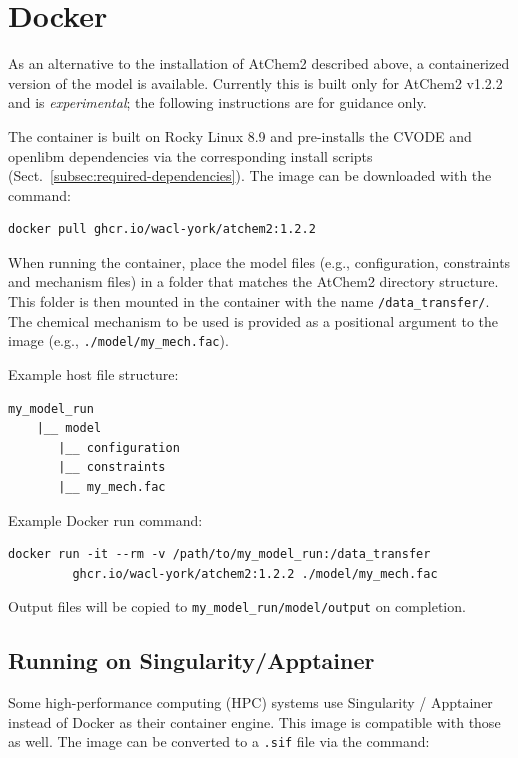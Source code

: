 \section{Docker} \label{sec:docker}

As an alternative to the installation of AtChem2 described above, a containerized version of
the model is available. Currently this is built only for AtChem2 v1.2.2 and is
\emph{experimental}; the following instructions are for guidance only.

The container is built on Rocky Linux 8.9 and pre-installs the CVODE and openlibm dependencies
via the corresponding install scripts (Sect.~\ref{subsec:required-dependencies}). The image can
be downloaded with the command:

\begin{Verbatim}[fontsize=\small]
  docker pull ghcr.io/wacl-york/atchem2:1.2.2
\end{Verbatim}

When running the container, place the model files (e.g., configuration, constraints and
mechanism files) in a folder that matches the AtChem2 directory structure. This folder is then
mounted in the container with the name \texttt{/data\_transfer/}. The chemical mechanism to be
used is provided as a positional argument to the image (e.g., \texttt{./model/my\_mech.fac}).

Example host file structure:
\begin{Verbatim}[fontsize=\small]
  my_model_run
    |__ model
       |__ configuration
       |__ constraints
       |__ my_mech.fac
\end{Verbatim}

Example Docker run command:

\begin{Verbatim}[fontsize=\small]
  docker run -it --rm -v /path/to/my_model_run:/data_transfer
         ghcr.io/wacl-york/atchem2:1.2.2 ./model/my_mech.fac
\end{Verbatim}

Output files will be copied to \texttt{my\_model\_run/model/output} on completion.

\subsection{Running on Singularity/Apptainer}

Some high-performance computing (HPC) systems use Singularity / Apptainer instead of Docker as their container engine. This
image is compatible with those as well. The image can be converted to a \texttt{.sif} file via
the command:

